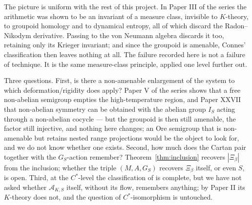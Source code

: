 \documentclass[11pt]{amsart}
\numberwithin{equation}{section}
\theoremstyle{definition}
\theoremstyle{remark}
\newcommand{\cA}{\mathcal{A}}
\begin{document}
The picture is uniform with the rest of this project. In Paper III of the series the
arithmetic was shown to be an invariant of a measure class, invisible to $K$-theory, to groupoid homology
and to dynamical entropy, all of which discard the Radon--Nikodym derivative. Passing to the
von Neumann algebra discards it too, retaining only its Krieger invariant; and since the
groupoid is amenable, Connes' classification then leaves nothing at all. The failure recorded
here is not a failure of technique. It is the same measure-class principle, applied one level
further out.

Three questions. First, is there a non-amenable enlargement of the system to which
deformation/rigidity does apply? Paper V of the series shows that a free non-abelian
semigroup empties the high-temperature region, and Paper XXVII that non-abelian symmetry
can be obtained with the abelian group $I_S$ acting through a non-abelian cocycle --- but
the groupoid is then still amenable, the factor still injective, and nothing here changes;
an Ore semigroup that is non-amenable but retains nested range projections would be the
object to look for, and we do not know whether one exists. Second, how much does the Cartan pair together with the
$G_S$-action remember? Theorem~\ref{thm:inclusion} recovers $|\Xi_\beta|$ from the inclusion;
whether the triple $(M,A,G_S)$ recovers $\Xi_\beta$ itself, or even $S$, is open. Third, at
the $C^*$-level the classification of \cite{Main} is complete, but we have not asked whether
$\cA_{K,S}$ itself, without its flow, remembers anything; by Paper II its $K$-theory does
not, and the question of $C^*$-isomorphism is untouched.
\end{document}
